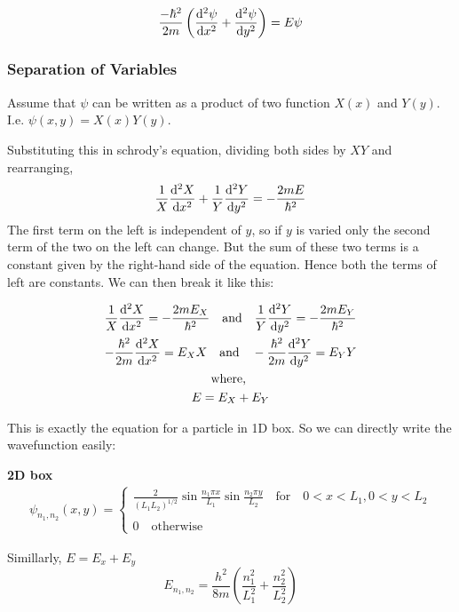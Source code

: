 \documentclass[11pt]{article}
\theoremstyle{definition}
\begin{document}
\begin{equation*}
    \frac{-\hbar^2}{2m} \left(\dv[2]{\psi}{x} + \dv[2]{\psi}{y}\right) = E \psi
\end{equation*}

\subsubsection{Separation of Variables}

Assume that $\psi$ can be written as a product of two function $X(x)$ and $Y(y)$. I.e. $\psi(x,y) = X(x) Y(y)$.

Substituting this in schrody's equation, dividing both sides by $XY$ and rearranging,
\begin{equation*}
    \frac{1}{X}\dv[2]{X}{x} + \frac{1}{Y} \dv[2]{Y}{y} = -\frac{2mE}{\hbar^2}
\end{equation*}
The first term on the left is independent of $y$, so if $y$ is varied only the second term of the two on the left can change. But the sum of these two terms is a constant given by the right-hand side of the equation. Hence both the terms of left are constants. We can then break it like this:

\begin{gather*}
    \frac{1}{X}\dv[2]{X}{x} =-\frac{2mE_X}{\hbar^2} \quad \text{and} \quad \frac{1}{Y}\dv[2]{Y}{y} =-\frac{2mE_Y}{\hbar^2}\\
    -\frac{\hbar^2}{2m} \dv[2]{X}{x} = E_X X \quad \text{and} \quad  -\frac{\hbar^2}{2m} \dv[2]{Y}{y} = E_Y Y\\
    \text{where, }\\
    E = E_X + E_Y
\end{gather*}

This is exactly the equation for a particle in 1D box. So we can directly write the wavefunction easily:

\begin{shaded}
\textbf{2D box}
\begin{gather*}
    \psi_{n_1, n_2}(x,y) = \begin{cases}
    \frac{2}{(L_1 L_2)^{1/2}} \sin{\frac{n_1 \pi x}{L_1}} \sin{\frac{n_2 \pi y}{L_2}} \quad \text{for} \quad 0<x<L_1, 0<y<L_2\\
    \\
    0 \quad \text{otherwise}
    \end{cases}
\end{gather*}

Simillarly, $E = E_x + E_y$
\begin{equation*}
    E_{n_1, n_2} = \frac{h^2}{8m} \left(\frac{n_1^2}{L_1^2} + \frac{n_2^2}{L_2^2}\right)
\end{equation*}
\end{shaded}
\end{document}
